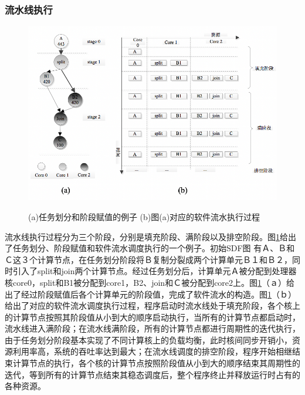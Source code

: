 \subsubsection{流水线执行}

\begin{figure}[htbp]
  \centering
  \includegraphics[width=1.0\textwidth]{Img/Chap_Application/Yu/streamline.png}\\
  \caption{(a)任务划分和阶段赋值的例子 (b)图(a)对应的软件流水执行过程}\label{fig:streamline}
\end{figure}

流水线执行过程分为三个阶段，分别是填充阶段、满阶段以及排空阶段。图\ref{fig:streamline}给出了任务划分、阶段赋值和软件流水调度执行的一个例子。初始SDF图 有Ａ、Ｂ和Ｃ这３个计算节点，在任务划分阶段将Ｂ复制分裂成两个计算单元Ｂ１和Ｂ２，同时引入了split和join两个计算节点。经过任务划分后，计算单元Ａ被分配到处理器核core0，split和B1被分配到core1，B2、join和Ｃ被分配到core2上。图\ref{fig:streamline}（ａ）给出了经过阶段赋值后各个计算单元的阶段值，完成了软件流水的构造。图\ref{fig:streamline}（ｂ）给出了对应的软件流水调度执行过程，程序启动时流水线处于填充阶段，各个核上的计算节点按照其阶段值从小到大的顺序启动执行，当所有的计算节点都启动时，流水线进入满阶段；在流水线满阶段，所有的计算节点都进行周期性的迭代执行，由于任务划分阶段基本实现了不同计算核上的负载均衡，此时核间同步开销小，资源利用率高，系统的吞吐率达到最大；在流水线调度的排空阶段，程序开始相继结束计算节点的执行，各个核的计算节点按照阶段值从小到大的顺序结束其周期性的迭代，等到所有的计算节点结束其稳态调度后，整个程序终止并释放运行时占有的各种资源。

